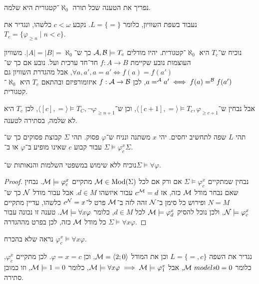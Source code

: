 \question{}
נפריך את הטענה שכל תורה $\aleph_0$־קטגורית היא שלמה.
\begin{solution}
	נעבוד בשפת השוויון, כלומר $L = \{ = \}$.
	נקבע $c < \omega$ כלשהו, ונגדיר את $T_c = \{ \varphi_{\ge n} \mid n < c \}$.

	נוכיח ש־$T_c$ היא $\aleph_0$־קטגורית.
	יהיו מודלים $\mathcal{A}, \mathcal{B} \models T_c$ כך ש־$|A| = |B| = \aleph_0$.
	משוויון העוצמות נובע שקיימת $f : A \to B$ חד־חד ערכית ועל.
	נובע אם כך ש־$\forall a, a', a = a' \iff f(a) = f(a')$, אבל מהגדרת השוויון גם $a =^{\mathcal{A}} a' \iff f(a) =^{\mathcal{B}} f(a')$, לכן $f : \mathcal{A} \to \mathcal{B}$ איזומורפיזם ובהתאם $T_c$ היא $\aleph_0$־קטגורית.

	אבל נבחין ש־$\langle [c + 1], = \rangle \models T_c, \varphi_{\ge c + 1}$, וכן ש־$\langle [c], = \rangle \models T_C, \lnot \varphi_{\ge n + 1}$, לכן $T_c$ היא לא שלמה, בסתירה לטענה.
\end{solution}

\question{}
תהי $L$ שפה לתחשיב יחסים.
יהי $x$ משתנה ונניח ש־$\varphi$ פסוק.
תהי $\Sigma$ קבוצת פסוקים כך ש־$\Sigma \models \varphi_c^x$ עבור קבוע $c$ שאינו מופיע ב־$\varphi$ או ב־$\Sigma$.

\subquestion{}
נוכיח ללא שימוש במשפטי השלמות והנאותות ש־$\Sigma \models \forall \varphi$.
\begin{proof}
	נבחין שמתקיים $\Sigma \models \varphi_c^x$ אם ורק אם לכל $\mathcal{M} \in \operatorname{Mod}(\Sigma)$ מתקיים $\mathcal{M} \models \varphi_c^x$.
	נבחין שאם נבחר מודל $\mathcal{M}$ כזה, אז $c^{\mathcal{M}} = d$ עבור איזשהו $d \in M$.
	אבל עבור מודל $\mathcal{N}$ כך ש־$N = M$ ופירוש כל סימן ב־$\mathcal{N}$ זהה לזה ב־$\mathcal{M}$ פרט ל־$c^{\mathcal{N}} = x$ כלשהו, עדיין מתקיים $\mathcal{N} \models \varphi_c^x$,
	ולכן נוכל להסיק $\mathcal{M} \models \varphi_d^x$ לכל $d \in M$, כלומר $\mathcal{M} \models \forall x \varphi$.
	טענה זו נכונה עבור כל מודל $\mathcal{M}$ כזה, לכן בפרט מההגדרה $\Sigma \models \forall x \varphi$.
\end{proof}

\subquestion{}
נראה שלא בהכרח $\varphi_c^x \models \forall x \varphi$.
\begin{solution}
	נגדיר את השפה $L = \{ =, c \}$ וכן את המודל $\mathcal{M} = \langle 2; 0 \rangle$, וכן $\varphi = x = c$.
	לכן מתקיים $\varphi_c^x$, כלומר $\mathcal{M}\ models 0 = 0$, אבל $\mathcal{M} \models \forall x \varphi \implies \mathcal{M} \models \varphi_1^x$, כלומר $\mathcal{M} \models 1 = 0$, וזו כמובן סתירה.
\end{solution}


